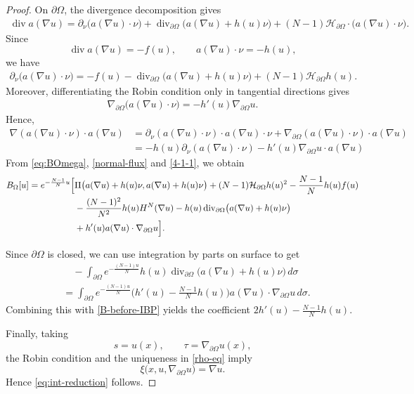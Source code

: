 \documentclass[reqno, 11pt]{amsart} %
\numberwithin{equation}{section}
\theoremstyle{definition}
\newcommand{\pa}{\partial}
\begin{document}
\begin{proof}
On $\partial\Omega$, the divergence decomposition gives
\begin{align}\label{boundary-div-decomposition}
    \operatorname{div}a(\nabla u) = \partial_\nu\bigl(a(\nabla u)\cdot\nu\bigr) + \operatorname{div}_{\pa \Omega} \bigl(a(\nabla u)+h(u)\nu\bigr) 
    +(N-1) \mathcal{H}_{\pa \Omega} \cdot \bigl(a(\nabla u)\cdot\nu\bigr).
\end{align}
Since
\[
    \operatorname{div}a(\nabla u)=-f(u), \qquad a(\nabla u)\cdot\nu=-h(u),
\]
we have
\begin{align}\label{normal-flux}
    \partial_\nu\bigl(a(\nabla u)\cdot\nu\bigr) = -f(u) -\operatorname{div}_{\pa \Omega} \bigl(a(\nabla u) + h(u)\nu\bigr) + (N-1)\mathcal{H}_{\pa \Omega} h(u).
\end{align}
Moreover, differentiating the Robin condition only in tangential
directions gives
\begin{align*}
    \nabla_{\pa \Omega}\bigl(a(\nabla u)\cdot\nu\bigr) =-h'(u)\nabla_{\pa \Omega} u.
\end{align*}
Hence,
\begin{align}\label{4-1-1}
    \nabla(a(\nabla u) \cdot \nu) \cdot a(\nabla u) & = \pa_{\nu} (a(\nabla u) \cdot \nu) \cdot a(\nabla u) \cdot \nu + \nabla_{\pa \Omega} (a(\nabla u) \cdot \nu) \cdot a(\nabla u) \\
    & = -h(u) \pa_{\nu} (a(\nabla u) \cdot \nu) - h'(u) \nabla_{\pa \Omega} u \cdot a(\nabla u) \nonumber
\end{align}
From \eqref{eq:BOmega}, \eqref{normal-flux} and \eqref{4-1-1}, we obtain
\begin{align}\label{B-before-IBP}
    B_\Omega[u] =e^{-\frac{N-1}{N} u}\Bigl[ & \Pi\bigl(a(\nabla u)+h(u)\nu, a(\nabla u)+h(u)\nu\bigr) +(N-1)\mathcal{H}_{\pa \Omega} h(u)^2 - \frac{N-1}{N} h(u)f(u) \nonumber\\
    & -\frac{(N-1)^2}{N^2}h(u)H^N(\nabla u) -h(u) \operatorname{div}_{\pa \Omega} \bigl(a(\nabla u)+h(u)\nu\bigr) \nonumber\\
    & +h'(u)a(\nabla u)\cdot\nabla_{\pa \Omega} u \Bigr].
\end{align}

Since $\partial\Omega$ is closed, we can use integration by parts on  surface to get
\begin{align}
    &\quad-\int_{\partial\Omega}e^{- \frac{(N-1)u}{N}}h(u) \operatorname{div}_{\pa \Omega} \bigl(a(\nabla u)+h(u)\nu\bigr)\,d\sigma \nonumber\\
    & = \int_{\partial\Omega}e^{- \frac{(N-1)u}{N}} \bigg( h'(u)- \frac{N-1}{N} h(u) \bigg) a(\nabla u)\cdot\nabla_{\pa \Omega} u\,d\sigma.
\end{align}
Combining this with \eqref{B-before-IBP} yields the coefficient $2h'(u)- \frac{N-1}{N} h(u)$.

Finally, taking
\[
    s=u(x),\qquad \tau=\nabla_{\pa \Omega} u(x),
\]
the Robin condition and the uniqueness in \eqref{rho-eq} imply
\[
    \xi\bigl(x,u,\nabla_{\pa \Omega} u\bigr)=\nabla u.
\]
Hence \eqref{eq:int-reduction} follows.
\end{proof}
\end{document}
